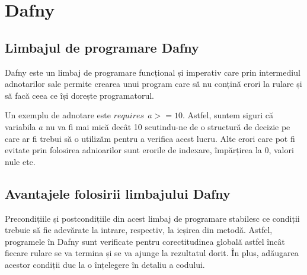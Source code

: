 \chapter{Dafny}

\section{Limbajul de programare Dafny}
Dafny este un limbaj de programare funcțional și imperativ care prin intermediul adnotarilor sale permite crearea unui program care să nu conțină erori la rulare și să facă ceea ce își dorește programatorul.\par
Un exemplu de adnotare este $ requires \ \ a >= 10 $. Astfel, suntem siguri că variabila $a$ nu va fi mai mică decât 10 scutindu-ne de o structură de decizie pe care ar fi trebui să o utilizăm pentru a verifica acest lucru. Alte erori care pot fi evitate prin folosirea adnioarilor sunt erorile de indexare, împărțirea la 0, valori nule etc.
\par 


\section{Avantajele folosirii limbajului Dafny}
Precondițiile și postcondițiile din acest limbaj de programare stabilesc ce condiții trebuie să fie adevărate la intrare, respectiv, la ieșirea din metodă. Astfel, programele în Dafny sunt verificate pentru corectitudinea globală astfel încât fiecare rulare se va termina și se va ajunge la rezultatul dorit.
În plus, adăugarea acestor condiții duc la o înțelegere în detaliu a codului. 









